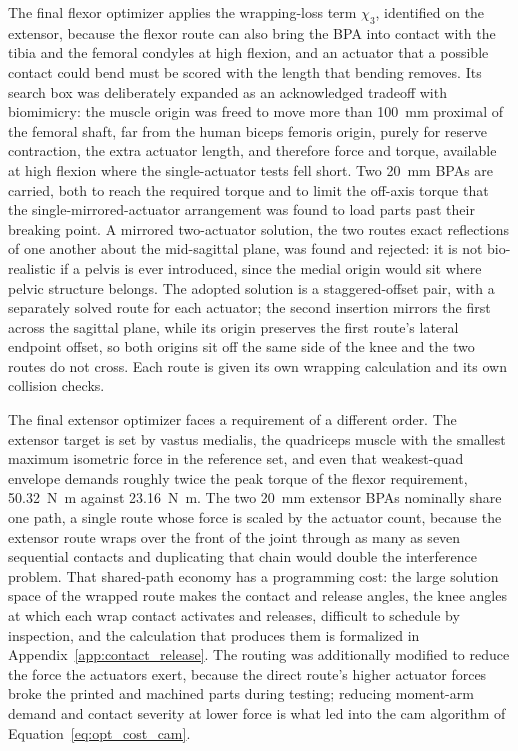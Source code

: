 The final flexor optimizer applies the wrapping-loss term $\chi_{3}$, identified on the extensor, because the flexor route can also bring the BPA into contact with the tibia and the femoral condyles at high flexion, and an actuator that a possible contact could bend must be scored with the length that bending removes. Its search box was deliberately expanded as an acknowledged tradeoff with biomimicry: the muscle origin was freed to move more than \qty{100}{\mm} proximal of the femoral shaft, far from the human biceps femoris origin, purely for reserve contraction, the extra actuator length, and therefore force and torque, available at high flexion where the single-actuator tests fell short. Two \qty{20}{\mm} BPAs are carried, both to reach the required torque and to limit the off-axis torque that the single-mirrored-actuator arrangement was found to load parts past their breaking point. A mirrored two-actuator solution, the two routes exact reflections of one another about the mid-sagittal plane, was found and rejected: it is not bio-realistic if a pelvis is ever introduced, since the medial origin would sit where pelvic structure belongs. The adopted solution is a staggered-offset pair, with a separately solved route for each actuator; the second insertion mirrors the first across the sagittal plane, while its origin preserves the first route's lateral endpoint offset, so both origins sit off the same side of the knee and the two routes do not cross. Each route is given its own wrapping calculation and its own collision checks.

The final extensor optimizer faces a requirement of a different order. The extensor target is set by vastus medialis, the quadriceps muscle with the smallest maximum isometric force in the reference set, and even that weakest-quad envelope demands roughly twice the peak torque of the flexor requirement, \qty{50.32}{\newton\meter} against \qty{23.16}{\newton\meter}. The two \qty{20}{\mm} extensor BPAs nominally share one path, a single route whose force is scaled by the actuator count, because the extensor route wraps over the front of the joint through as many as seven sequential contacts and duplicating that chain would double the interference problem. That shared-path economy has a programming cost: the large solution space of the wrapped route makes the contact and release angles, the knee angles at which each wrap contact activates and releases, difficult to schedule by inspection, and the calculation that produces them is formalized in Appendix~\ref{app:contact_release}. The routing was additionally modified to reduce the force the actuators exert, because the direct route's higher actuator forces broke the printed and machined parts during testing; reducing moment-arm demand and contact severity at lower force is what led into the cam algorithm of Equation~\eqref{eq:opt_cost_cam}.

